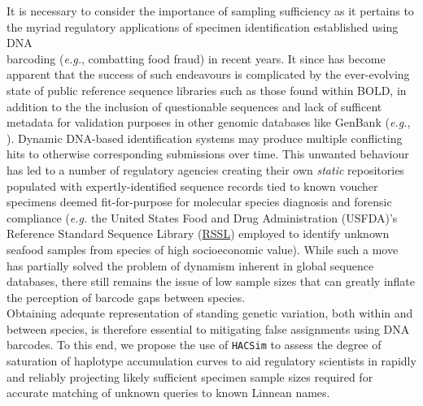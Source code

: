 It is necessary to consider the importance of sampling sufficiency as it pertains to \\ the myriad regulatory applications of specimen identification  established using DNA \\ barcoding (\textit{e.g.}, combatting food fraud) in recent years. It since has become apparent that the success of such endeavours is complicated by the ever-evolving state of public reference sequence libraries such as those found within BOLD, in addition to the the inclusion of questionable sequences and lack of sufficent metadata for validation purposes in other genomic databases like GenBank (\textit{e.g.}, \cite{harris2003can}). Dynamic DNA-based identification systems may produce multiple conflicting hits to otherwise corresponding submissions over time. This unwanted behaviour has led to a number of regulatory agencies creating their own \textit{static} repositories populated with expertly-identified sequence records tied to known voucher specimens deemed fit-for-purpose for molecular species diagnosis and forensic compliance (\textit{e.g.} the United States Food and Drug Administration (USFDA)'s Reference Standard Sequence Library (\href{https://www.accessdata.fda.gov/scripts/fdcc/?set=seafood_barcode_data}{RSSL}) employed to identify unknown seafood samples from species of high socioeconomic value). While such a move has partially solved the problem of dynamism inherent in global sequence databases, there still remains the issue of low sample sizes that can greatly inflate the perception of barcode gaps between species. \\ Obtaining adequate representation of standing genetic variation, both within and between species, is therefore essential to mitigating false assignments using DNA barcodes. To this end, we propose the use of {\tt HACSim} to assess the degree of saturation of haplotype accumulation curves to aid regulatory scientists in rapidly and reliably projecting likely sufficient specimen sample sizes required for accurate matching of unknown queries to known Linnean names.



